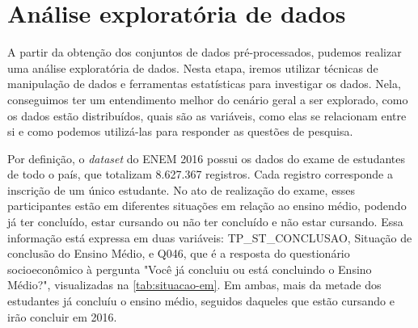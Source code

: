 \section{Análise exploratória de dados}
\label{sec:eda}
A partir da obtenção dos conjuntos de dados pré-processados, pudemos realizar uma análise exploratória de dados. Nesta etapa, iremos utilizar técnicas de manipulação de dados e ferramentas estatísticas para investigar os dados. Nela, conseguimos ter um entendimento melhor do cenário geral a ser explorado, como os dados estão distribuídos, quais são as variáveis, como elas se relacionam entre si e como podemos utilizá-las para responder as questões de pesquisa.

Por definição, o \textit{dataset} do ENEM 2016 possui os dados do exame de estudantes de todo o país, que totalizam 8.627.367 registros. Cada registro corresponde a inscrição de um único estudante. No ato de realização do exame, esses participantes estão em diferentes situações em relação ao ensino médio, podendo já ter concluído, estar cursando ou não ter concluído e não estar cursando. Essa informação está expressa em duas variáveis: TP\_ST\_CONCLUSAO, Situação de conclusão do Ensino Médio, e Q046, que é a resposta do questionário socioeconômico à pergunta "Você já concluiu ou está concluindo o Ensino Médio?", visualizadas na \autoref{tab:situacao-em}. Em ambas, mais da metade dos estudantes já concluíu o ensino médio, seguidos daqueles que estão cursando e irão concluir em 2016.

